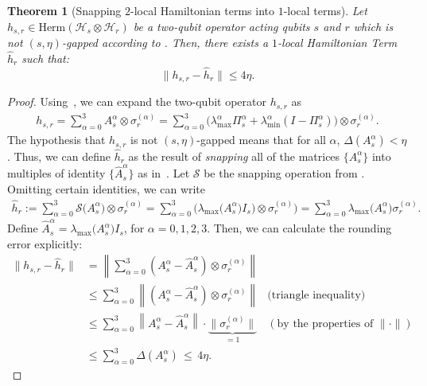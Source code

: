 \documentclass[11pt]{article}
\theoremstyle{plain}
\newtheorem{theorem}{Theorem}[section]
\begin{document}
\begin{theorem}[Snapping $2$-local Hamiltonian terms into $1$-local terms]
\label{thm:snapping-2-local-hamiltonian-term}
   Let $h_{s,r} \in \mathrm{Herm}(\mathcal{H}_s \otimes \mathcal{H}_r)$ be a two-qubit operator acting qubits $s$ and $r$ which is not $(s,\eta)$-gapped according to . Then, there exists a $1$-local Hamiltonian Term $\hat{h}_{r}$ such that:
    \begin{equation}
    \label{eqn:snapped-distance-between-hamiltonian-terms}
        \|h_{s,r} - \hat{h}_{r}\| \leq 4 \eta.
    \end{equation}
\end{theorem}
\begin{proof}
Using~, we can expand the two-qubit operator $h_{s,r}$ as
    \begin{align*}
        h_{s,r} = \sum\limits_{\alpha = 0}^{3} A_{s}^{\alpha} \otimes \sigma_{r}^{(\alpha)}
        = \sum\limits_{\alpha = 0}^{3} \Big(\lambda_{\max}^{\alpha} \Pi_{s}^{\alpha} + \lambda_{\min}^{\alpha} \left(I - \Pi_{s}^{\alpha}\right)\Big) \otimes \sigma_{r}^{(\alpha)}.
    \end{align*}
The hypothesis that $h_{s,r}$ is not $(s,\eta)$-gapped  means that for all $\alpha$, $\Delta(A_{s}^{\alpha}) < \eta$. Thus, we can define $\hat{h}_r$ as the result of \emph{snapping} all of the matrices $\{A_s^{\alpha}\}$ into multiples of identity $\{\hat{A}_s^{\alpha}\}$ as in~. Let $\mathcal{S}$ be the snapping operation from . Omitting certain identities, we can write
\begin{align}
    \hat{h}_r := \sum\limits_{\alpha = 0}^{3} \mathcal{S}\big(A_{s}^{\alpha}\big) \otimes \sigma_{r}^{(\alpha)}
    = \sum\limits_{\alpha = 0}^{3}  \big(\lambda_{\max}\big(A_{s}^{\alpha}\big)I_s\big) \otimes \sigma_{r}^{(\alpha)}\big) =\sum\limits_{\alpha = 0}^{3} \lambda_{\max}\big(A_{s}^{\alpha}\big)  \sigma_{r}^{(\alpha)}.
\end{align}
Define $\hat{A}_s^{\alpha} =\lambda_{\max}\big(A_{s}^{\alpha}\big) I_s$, for $\alpha=0,1,2,3$. Then, we can calculate the rounding error explicitly:
\begin{align*}
    \|h_{s,r} - \hat{h}_{r}\| &= \left\|\sum\limits_{\alpha = 0}^{3} \left( A_s^{\alpha} - \hat{A}_s^{\alpha} \right)\otimes \sigma_{r}^{(\alpha)}\right\|\\
    &\leq \sum\limits_{\alpha = 0}^{3} \left\|\left( A_s^{\alpha} - \hat{A}_s^{\alpha} \right)\otimes \sigma_{r}^{(\alpha)} \right\| & \text{(triangle inequality)}\\
    &\leq \sum\limits_{\alpha = 0}^{3} \left\| A_s^{\alpha} - \hat{A}_s^{\alpha}  \right\| \cdot \underbrace{\| \sigma_r^{(\alpha)} \|}_{=1} & (\text{by the properties of } \|\cdot\|)\\
    &\leq \sum\limits_{\alpha = 0}^{3} \Delta(A_{s}^{\alpha}) \,\leq\, 4 \eta.
\end{align*}
\end{proof}
\end{document}

